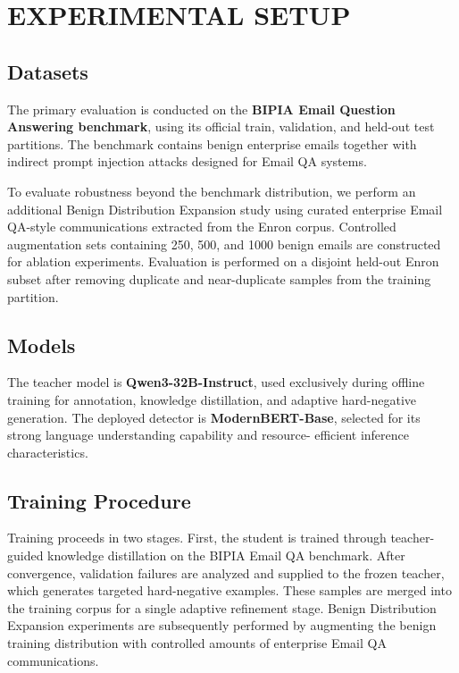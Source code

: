 \documentclass[conference]{IEEEtran}
\begin{document}
\section{EXPERIMENTAL SETUP}

\subsection{Datasets}

The primary evaluation is conducted on the \textbf{BIPIA Email Question Answering benchmark}, using
its official train, validation, and held-out test partitions. The benchmark contains benign
enterprise emails together with indirect prompt injection attacks designed for Email QA systems.

To evaluate robustness beyond the benchmark distribution, we perform an additional Benign
Distribution Expansion study using curated enterprise Email QA-style communications extracted from
the Enron corpus. Controlled augmentation sets containing 250, 500, and 1000 benign emails are
constructed for ablation experiments. Evaluation is performed on a disjoint held-out Enron subset
after removing duplicate and near-duplicate samples from the training partition.

\subsection{Models}

The teacher model is \textbf{Qwen3-32B-Instruct}, used exclusively during offline training for
annotation, knowledge distillation, and adaptive hard-negative generation. The deployed detector is
\textbf{ModernBERT-Base}, selected for its strong language understanding capability and resource-
efficient inference characteristics.

\subsection{Training Procedure}

Training proceeds in two stages. First, the student is trained through teacher-guided knowledge
distillation on the BIPIA Email QA benchmark. After convergence, validation failures are analyzed
and supplied to the frozen teacher, which generates targeted hard-negative examples. These samples
are merged into the training corpus for a single adaptive refinement stage. Benign Distribution
Expansion experiments are subsequently performed by augmenting the benign training distribution with
controlled amounts of enterprise Email QA communications.
\end{document}
